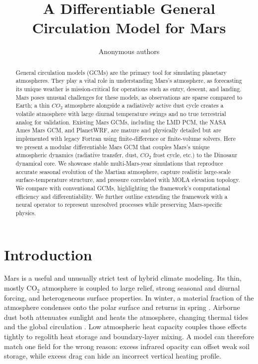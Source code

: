 \documentclass{article}
\title{A Differentiable General Circulation Model for Mars}
\author{Anonymous authors}
\begin{document}
\maketitle

\begin{abstract}

General circulation models (GCMs) are the primary tool for simulating planetary atmospheres. They play a vital role in understanding Mars's atmosphere, as forecasting its unique weather is mission-critical for operations such as entry, descent, and landing. Mars poses unusual challenges for these models, as observations are sparse compared to Earth; a thin $CO_2$ atmosphere alongside a radiatively active dust cycle creates a volatile atmosphere with large diurnal temperature swings and no true terrestrial analog for validation. Existing Mars GCMs, including the LMD PCM, the NASA Ames Mars GCM, and PlanetWRF, are mature and physically detailed but are implemented with legacy Fortran using finite-difference or finite-volume solvers. Here we present a modular differentiable Mars GCM that couples Mars's unique atmospheric dynamics (radiative transfer, dust, $CO_2$ frost cycle, etc.) to the Dinosaur dynamical core. We showcase stable multi-Mars-year simulations that reproduce accurate seasonal evolution of the Martian atmosphere, capture realistic large-scale surface-temperature structure, and pressure correlated with MOLA elevation topology. We compare with conventional GCMs, highlighting the framework's computational efficiency and differentiability. We further outline extending the framework with a neural operator to represent unresolved processes while preserving Mars-specific physics.
\end{abstract}




\section{Introduction}

Mars is a useful and unusually strict test of hybrid climate modeling. Its thin,
mostly \(\mathrm{CO_2}\) atmosphere is coupled to large relief, strong seasonal
and diurnal forcing, and heterogeneous surface properties. In winter, a material
fraction of the atmosphere condenses onto the polar surface and returns in
spring \citep{leighton1966co2,guo2009seasonal}. Airborne dust both attenuates
sunlight and heats the atmosphere, changing thermal tides and the global
circulation \citep{madeleine2011dust,montabone2015dust}. Low atmospheric heat
capacity couples those effects tightly to regolith heat storage and boundary-layer
mixing. A model can therefore match one field for the wrong reason: excess
infrared opacity can offset weak soil storage, while excess drag can hide an
incorrect vertical heating profile.
\end{document}
